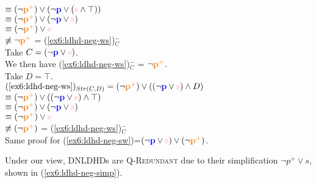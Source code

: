 \begin{exe}
{		 $\equiv (\neg\pplus) \vee (\neg\p\vee (\s \wedge \top))$\\
		 $\equiv (\neg\pplus) \vee (\neg\p\vee \s)$\\
		 $\equiv (\neg\pplus) \vee \s$\\
		 $\not\equiv \neg\textbf{\textcolor{orange}{p$^+$}}$ = (\ref{ex6:ldhd-neg-ws})$^-_C$\\
		Take $C = (\neg\p\vee\s)$.\\
		We then have (\ref{ex6:ldhd-neg-ws})$^-_C$ = $\neg\textbf{\textcolor{orange}{p$^+$}}$.\\
		Take $D = \top$.\\
		$(\textref{ex6:ldhd-neg-ws})_{Str(C, D)} = (\neg\pplus) \vee ((\neg\p\vee\s)\wedge D)$\\
		 $\equiv (\neg\pplus) \vee ((\neg\p\vee\s)\wedge \top)$\\
		 $\equiv (\neg\pplus) \vee (\neg\p\vee\s)$\\
		 $\equiv (\neg\pplus) \vee\s$\\
		 $\not\equiv (\neg\textbf{\textcolor{orange}{p$^+$}})$ = (\ref{ex6:ldhd-neg-ws})$^-_C$\\
		Same proof for (\ref{ex6:ldhd-neg-sw})=$(\neg\p\vee\s)\vee(\neg\pplus)$.}\label{ex6:ldhd-neg-sr}
\end{exe}


Under our view, DNLDHDs are \textsc{Q-Redundant} due to their simplification $\neg p^+ \vee s$, shown in (\ref{ex6:ldhd-neg-simp}).

\begin{exe}
	\label{ex6:ldhd-neg-simp}
\end{exe}

